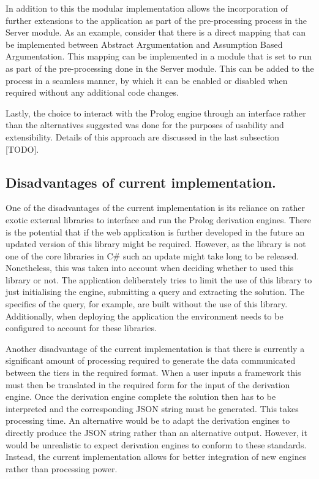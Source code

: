 In addition to this the modular implementation allows the incorporation of further extensions to the application as part of the pre-processing process in the Server module. As an example, consider that there is a direct mapping that can be implemented between Abstract Argumentation and Assumption Based Argumentation. This mapping can be implemented in a module that is set to run as part of the pre-processing done in the Server module. This can be added to the process in a seamless manner, by which it can be enabled or disabled when required without any additional code changes.

Lastly, the choice to interact with the Prolog engine through an interface rather than the alternatives suggested was done for the purposes of usability and extensibility. Details of this approach are discussed in the last subsection [TODO]. 

\subsection{Disadvantages of current implementation.}

One of the disadvantages of the current implementation is its reliance on rather exotic external libraries to interface and run the Prolog derivation engines. There is the potential that if the web application is further developed in the future an updated version of this library might be required. However, as the library is not one of the core libraries in C\# such an update might take long to be released. Nonetheless, this was taken into account when deciding whether to used this library or not. The application deliberately tries to limit the use of this library to just initialising the engine, submitting a query and extracting the solution. The specifics of the query, for example, are built without the use of this library. Additionally, when deploying the application the environment needs to be configured to account for these libraries.

Another disadvantage of the current implementation is that there is currently a significant amount of processing required to generate the data communicated between the tiers in the required format. When a user inputs a framework this must then be translated in the required form for the input of the derivation engine. Once the derivation engine complete the solution then has to be interpreted and the corresponding JSON string must be generated. This takes processing time. An alternative would be to adapt the derivation engines to directly produce the JSON string rather than an alternative output. However, it would be unrealistic to expect derivation engines to conform to these standards. Instead, the current implementation allows for better integration of new engines rather than processing power.

